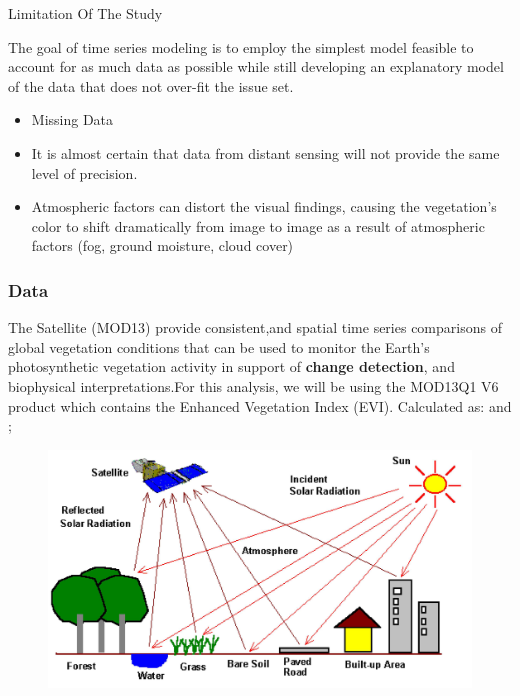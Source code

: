 \documentclass[11pt]{beamer}
\begin{document}
\begin{frame}
	\begin{block}{Limitation Of The Study}		
	
The goal of time series modeling is to employ the simplest model feasible to account for as much data as possible while still developing an explanatory model of the data that does not over-fit the issue set.

\begin{itemize}
	\item Missing Data
	\item It is almost certain that data from distant sensing will not provide the same level of precision.
	\item Atmospheric factors can distort the visual findings, causing the vegetation's color to shift dramatically from image to image as a result of atmospheric factors (fog, ground moisture, cloud cover)
\end{itemize}
	\end{block}
\end{frame}
\begin{frame}
	\frametitle{Data}
		
The Satellite (MOD13) provide consistent,and spatial time series comparisons of global vegetation conditions that can be used to monitor the Earth’s  photosynthetic vegetation activity in support of  \textbf{change detection}, and biophysical interpretations.For this analysis, we will be using the MOD13Q1 V6 product which contains the Enhanced Vegetation Index (EVI). Calculated as: and ;
	\begin{figure}
		\centering
		\includegraphics[width=0.7\linewidth]{images/classification}
		\caption{}
		\label{fig:classification}
	\end{figure}
	
\end{frame}
\end{document}
